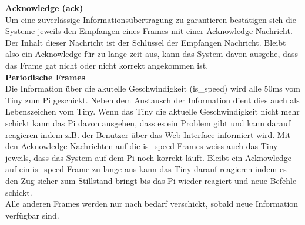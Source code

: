 \documentclass[../../main.tex]{subfiles}
\begin{document}
        \textbf{Acknowledge (ack)}\\
        Um eine zuverlässige Informationsübertragung zu garantieren bestätigen sich die Systeme jeweils den Empfangen eines Frames mit einer Acknowledge Nachricht. Der Inhalt dieser Nachricht ist der Schlüssel der Empfangen Nachricht. Bleibt also ein Acknowledge für zu lange zeit aus, kann das System davon ausgehe, dass das Frame gat nicht oder nicht korrekt angekommen ist.\\

        \textbf{Periodische Frames}\\
        Die Information über die akutelle Geschwindigkeit (is\_speed) wird alle 50ms vom Tiny zum Pi geschickt. Neben dem Austausch der Information dient dies auch als Lebenszeichen vom Tiny. Wenn das Tiny die aktuelle Geschwindigkeit nicht mehr schickt kann das Pi davon ausgehen, dass es ein Problem gibt und kann darauf reagieren indem z.B. der Benutzer über das Web-Interface informiert wird. Mit den Acknowledge Nachrichten auf die is\_speed Frames weiss auch das Tiny jeweils, dass das System auf dem Pi noch korrekt läuft. Bleibt ein Acknowledge auf ein is\_speed Frame zu lange aus kann das Tiny darauf reagieren indem es den Zug sicher zum Stillstand bringt bis das Pi wieder reagiert und neue Befehle schickt.\\
        Alle anderen Frames werden nur nach bedarf verschickt, sobald neue Information verfügbar sind.

    
\end{document}
